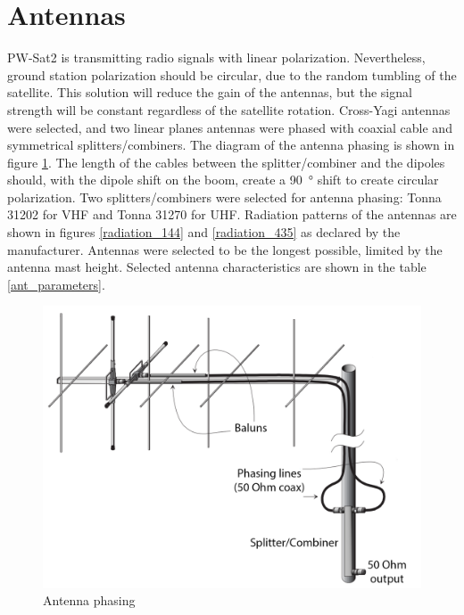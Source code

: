 \section{Antennas}
PW-Sat2 is transmitting radio signals with linear polarization. Nevertheless, ground station polarization should be circular, due to the random tumbling of the satellite. This solution will reduce the gain of the antennas, but the signal strength will be constant regardless of the satellite rotation. Cross-Yagi antennas were selected, and two linear planes antennas were phased with coaxial cable and symmetrical splitters/combiners. The diagram of the antenna phasing is shown in figure \ref{antenna_phasing_diagram}. The length of the cables between the splitter/combiner and the dipoles should, with the dipole shift on the boom, create a \SI{90}{\degree} shift to create circular polarization. Two splitters/combiners were selected for antenna phasing: Tonna 31202 for VHF and Tonna 31270 for UHF. Radiation patterns of the antennas are shown in figures \ref{radiation_144} and \ref{radiation_435} as declared by the manufacturer. Antennas were selected to be the longest possible, limited by the antenna mast height. Selected antenna characteristics are shown in the table \ref{ant_parameters}.

\begin{figure}
    \centering
    \includegraphics[width=0.5\paperwidth]{img/7/antenna_phasing_diagram.png}
    \caption{Antenna phasing}
    \label{antenna_phasing_diagram}
\end{figure}


